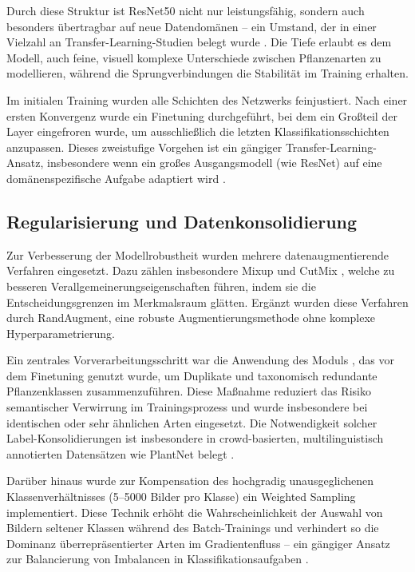 Durch diese Struktur ist \ac{ResNet50} nicht nur leistungsfähig, sondern auch besonders übertragbar auf neue Datendomänen – ein Umstand, der in einer Vielzahl an Transfer-Learning-Studien belegt wurde \cite{Kornblith2019}. Die Tiefe erlaubt es dem Modell, auch feine, visuell komplexe Unterschiede zwischen Pflanzenarten zu modellieren, während die Sprungverbindungen die Stabilität im Training erhalten.

 Im initialen Training wurden alle Schichten des Netzwerks feinjustiert. Nach einer ersten Konvergenz wurde ein Finetuning durchgeführt, bei dem ein Großteil der Layer eingefroren wurde, um ausschließlich die letzten Klassifikationsschichten anzupassen. Dieses zweistufige Vorgehen ist ein gängiger Transfer-Learning-Ansatz, insbesondere wenn ein großes Ausgangsmodell (wie \ac{ResNet}) auf eine domänenspezifische Aufgabe adaptiert wird \cite{Pan2010}.

\subsection{Regularisierung und Datenkonsolidierung}
Zur Verbesserung der Modellrobustheit wurden mehrere datenaugmentierende Verfahren eingesetzt. Dazu zählen insbesondere Mixup \cite{Zhang2018} und CutMix \cite{Yun2019}, welche zu besseren Verallgemeinerungseigenschaften führen, indem sie die Entscheidungsgrenzen im Merkmalsraum glätten. Ergänzt wurden diese Verfahren durch RandAugment, eine robuste Augmentierungsmethode ohne komplexe Hyperparametrierung.

Ein zentrales Vorverarbeitungsschritt war die Anwendung des Moduls , das vor dem Finetuning genutzt wurde, um Duplikate und taxonomisch redundante Pflanzenklassen zusammenzuführen. Diese Maßnahme reduziert das Risiko semantischer Verwirrung im Trainingsprozess und wurde insbesondere bei identischen oder sehr ähnlichen Arten eingesetzt. Die Notwendigkeit solcher Label-Konsolidierungen ist insbesondere in crowd-basierten, multilinguistisch annotierten Datensätzen wie PlantNet belegt \cite{Horn2018}.

Darüber hinaus wurde zur Kompensation des hochgradig unausgeglichenen Klassenverhältnisses (5–5000 Bilder pro Klasse) ein Weighted Sampling implementiert. Diese Technik erhöht die Wahrscheinlichkeit der Auswahl von Bildern seltener Klassen während des Batch-Trainings und verhindert so die Dominanz überrepräsentierter Arten im Gradientenfluss – ein gängiger Ansatz zur Balancierung von Imbalancen in Klassifikationsaufgaben \cite{Buda2018}.

